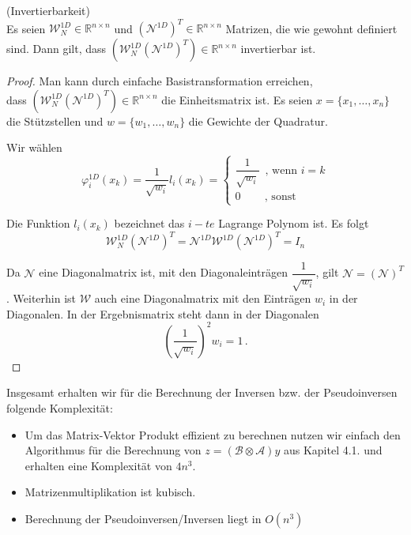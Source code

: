 \begin{Bemerkung} (Invertierbarkeit) \\ \label{bem:unit}
Es seien $\mathcal{W}_N^{1D} \in \mathbb{R}^{n \times n}$ und $(\mathcal{N}^{1D})^T \in \mathbb{R}^{n \times n}$ Matrizen, die wie gewohnt definiert sind. Dann gilt, dass $(\mathcal{W}_N^{1D} (\mathcal{N}^{1D})^T) \in \mathbb{R}^{n \times n}$ invertierbar ist.

\begin{proof}
Man kann durch einfache Basistransformation erreichen, \\ dass $(\mathcal{W}_N^{1D} (\mathcal{N}^{1D})^T) \in \mathbb{R}^{n \times n}$  die Einheitsmatrix ist. Es seien $x=\{x_1,\dots,x_n\}$ die Stützstellen und $w=\{w_1,\dots,w_n\}$ die Gewichte der Quadratur.

Wir wählen 
\begin{equation*}
\varphi^{1D}_i (x_k) = \dfrac{1}{ \sqrt{w_i} } l_i (x_k) = 
\begin{cases}
\dfrac{1}{ \sqrt{w_i} } \, \text{ , wenn } i=k  \\
0  \, \, \, \, \, \, \, \, \, \, \, \text{ , sonst }
\end{cases}
\end{equation*}

Die Funktion $l_i(x_k)$ bezeichnet das $i-te$ Lagrange Polynom ist.
Es folgt 
\begin{equation*}
\mathcal{W}_N^{1D} (\mathcal{N}^{1D})^T = \mathcal{N}^{1D} \mathcal{W}^{1D} (\mathcal{N}^{1D})^T = I_n
\end{equation*}

Da $\mathcal{N}$ eine Diagonalmatrix ist, mit den Diagonaleinträgen $\dfrac{1}{ \sqrt{w_i} }$, gilt $\mathcal{N}=(\mathcal{N})^T$. Weiterhin ist $\mathcal{W}$ auch eine Diagonalmatrix mit den Einträgen $w_i$ in der Diagonalen. In der Ergebnismatrix steht dann in der Diagonalen 
\begin{equation*}
(\dfrac{1}{ \sqrt{w_i} })^2  w_i = 1 \, .
\end{equation*}
 
\end{proof}
\end{Bemerkung}

Insgesamt erhalten wir für die Berechnung der Inversen bzw. der Pseudoinversen folgende Komplexität:
\begin{itemize}
\item Um das Matrix-Vektor Produkt effizient zu berechnen nutzen wir einfach den Algorithmus für die Berechnung von $z=(\mathcal{B} \otimes \mathcal{A})y$ aus Kapitel 4.1. und erhalten eine Komplexität von $4n^3$.

\item Matrizenmultiplikation ist kubisch.

\item Berechnung der Pseudoinversen/Inversen liegt in $O(n^3)$

\end{itemize}

